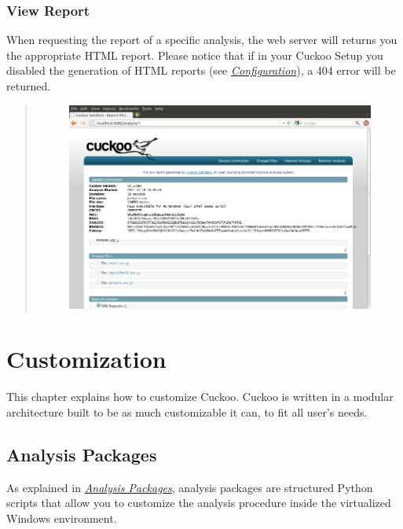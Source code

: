 \documentclass[letterpaper,10pt,english]{sphinxmanual}
\begin{document}
\subsubsection{View Report}
\label{usage/web:view-report}
When requesting the report of a specific analysis, the web server will returns
you the appropriate HTML report. Please notice that if in your Cuckoo Setup
you disabled the generation of HTML reports (see {\hyperref[installation/host/configuration::doc]{\emph{Configuration}}}),
a 404 error will be returned.
\begin{quote}
\begin{figure}[htbp]
\centering

\includegraphics{cuckoo_web_analysis.png}
\end{figure}
\end{quote}


\section{Customization}
\label{customization/index::doc}\label{customization/index:customization}
This chapter explains how to customize Cuckoo.
Cuckoo is written in a modular architecture built to be as much customizable it can,
to fit all user's needs.


\subsection{Analysis Packages}
\label{customization/packages:analysis-packages}\label{customization/packages::doc}
As explained in {\hyperref[usage/packages::doc]{\emph{Analysis Packages}}}, analysis packages are structured
Python scripts that allow you to customize the analysis procedure inside the
virtualized Windows environment.
\end{document}

